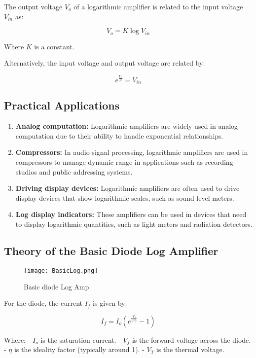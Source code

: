 \documentclass[a4paper,9pt,twoside,openany,twocolumn]{memoir}
\begin{document}
The output voltage \( V_o \) of a logarithmic amplifier is related to the input voltage \( V_{in} \) as:

\[
V_o = K \log V_{in}
\]

Where \( K \) is a constant.

Alternatively, the input voltage and output voltage are related by:

\[
e^{\frac{V_o}{K}} = V_{in}
\]

\subsection*{Practical Applications}
\begin{enumerate}
    \item \textbf{Analog computation:} Logarithmic amplifiers are widely used in analog computation due to their ability to handle exponential relationships.
    \item \textbf{Compressors:} In audio signal processing, logarithmic amplifiers are used in compressors to manage dynamic range in applications such as recording studios and public addressing systems.
    \item \textbf{Driving display devices:} Logarithmic amplifiers are often used to drive display devices that show logarithmic scales, such as sound level meters.
    \item \textbf{Log display indicators:} These amplifiers can be used in devices that need to display logarithmic quantities, such as light meters and radiation detectors.
\end{enumerate}

\subsection*{Theory of the Basic Diode Log Amplifier}
\begin{figure}[H]
    \centering
    \texttt{[image: BasicLog.png]}
    \caption{Basic diode Log Amp}
    \label{fig:question_image}
\end{figure}

For the diode, the current \( I_f \) is given by:

\[
I_f = I_o \left( e^{\frac{V_f}{\eta V_T}} - 1 \right) \tag{1}
\]

Where:
- \( I_o \) is the saturation current.
- \( V_f \) is the forward voltage across the diode.
- \( \eta \) is the ideality factor (typically around 1).
- \( V_T \) is the thermal voltage.
\end{document}

